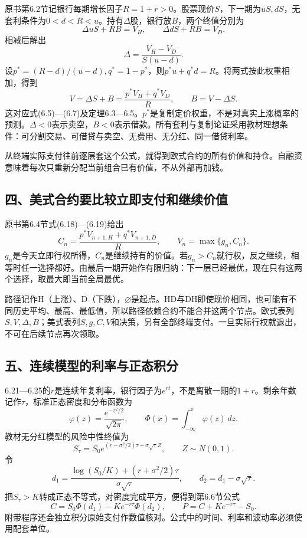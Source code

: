 \documentclass[11pt,a4paper,UTF8,fontset=fandol]{ctexart}
\begin{document}
原书第6.2节记银行每期增长因子\(R=1+r>0\)。股票现价\(S\)，下一期为\(uS,dS\)，无套利条件为\(0<d<R<u\)。持有\(\Delta\)股，银行放\(B\)，两个终值分别为
\[\Delta uS+RB=V_H,\qquad\Delta dS+RB=V_D.\] 相减后解出
\[\boxed{\Delta=\frac{V_H-V_D}{S(u-d)}.}\]
设\(p^*=(R-d)/(u-d),q^*=1-p^*\)，则\(p^*u+q^*d=R\)。将两式按此权重相加，得到
\[\boxed{V=\Delta S+B=\frac{p^*V_H+q^*V_D}{R},\qquad B=V-\Delta S.}\]
这对应式(6.5)---(6.7)及定理6.3---6.5。\(p^*\)是复制定价权重，不是对真实上涨概率的预测。\(\Delta<0\)表示卖空，\(B<0\)表示借款。所有套利与复制论证采用教材理想条件：可分割交易、可借贷与卖空、无费用、无分红、同一借贷利率。

从终端实际支付往前逐层套这个公式，就得到欧式合约的所有价值和持仓。自融资意味着每次只重新分配当前组合已有价值，不从外部再加钱。

\subsection{四、美式合约要比较立即支付和继续价值}\label{ux56dbux7f8eux5f0fux5408ux7ea6ux8981ux6bd4ux8f83ux7acbux5373ux652fux4ed8ux548cux7ee7ux7eedux4ef7ux503c}

原书第6.4节式(6.18)---(6.19)给出
\[C_n=\frac{p^*V_{n+1,H}+q^*V_{n+1,D}}R,\qquad
\boxed{V_n=\max\{g_n,C_n\}.}\]
\(g_n\)是今天立即行权所得，\(C_n\)是继续持有的价值。若\(g_n>C_n\)就行权，反之继续，相等时任一选择都好。由最后一期开始作有限归纳：下一层已经最优，现在只有这两个选择，取最大即当前全局最优。

路径记作H（上涨）、D（下跌），\(\varnothing\)是起点。HD与DH即使现价相同，也可能有不同历史平均、最高、最低值，所以路径依赖合约不能合并这两个节点。欧式表列\(S,V,\Delta,B\)；美式表列\(S,g,C,V\)和决策，另有全部终端支付。一旦实际行权就退出，不可在后续节点再次领取。

\subsection{五、连续模型的利率与正态积分}\label{ux4e94ux8fdeux7eedux6a21ux578bux7684ux5229ux7387ux4e0eux6b63ux6001ux79efux5206}

6.21---6.25的\(r\)是连续年复利率，银行因子为\(e^{rt}\)，不是离散一期的\(1+r\)。剩余年数记作\(\tau\)，标准正态密度和分布函数为
\[\varphi(z)=\frac{e^{-z^2/2}}{\sqrt{2\pi}},\qquad\Phi(x)=\int_{-\infty}^x\varphi(z)\,dz.\]
教材无分红模型的风险中性终值为
\[S_\tau=S_0e^{(r-\sigma^2/2)\tau+\sigma\sqrt\tau Z},\qquad Z\sim N(0,1).\]
令
\[d_1=\frac{\log(S_0/K)+(r+\sigma^2/2)\tau}{\sigma\sqrt\tau},\qquad d_2=d_1-\sigma\sqrt\tau.\]
把\(S_\tau>K\)转成正态不等式，对密度完成平方，便得到第6.6节公式
\[\boxed{C=S_0\Phi(d_1)-Ke^{-r\tau}\Phi(d_2),\qquad P=C+Ke^{-r\tau}-S_0.}\]
附带程序还会独立积分原始支付作数值核对。公式中的时间、利率和波动率必须使用配套单位。
\end{document}
